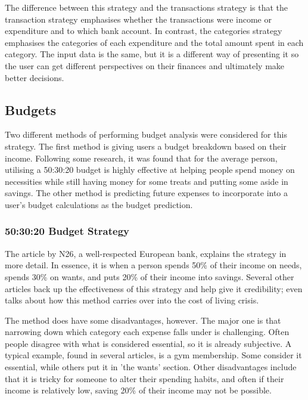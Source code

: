 The difference between this strategy and the transactions strategy is that the transaction strategy emphasises whether the transactions were income or expenditure and to which bank account. In contrast, the categories strategy emphasises the categories of each expenditure and the total amount spent in each category. The input data is the same, but it is a different way of presenting it so the user can get different perspectives on their finances and ultimately make better decisions.

\subsection{Budgets}
Two different methods of performing budget analysis were considered for this strategy. The first method is giving users a budget breakdown based on their income. Following some research, it was found that for the average person, utilising a 50:30:20 budget is highly effective at helping people spend money on necessities while still having money for some treats and putting some aside in savings. The other method is predicting future expenses to incorporate into a user's budget calculations as the budget prediction.

\subsubsection{50:30:20 Budget Strategy}

The article \cite{503020Strategy} by N26, a well-respected European bank, explains the strategy in more detail. In essence, it is when a person spends 50\% of their income on needs, spends 30\% on wants, and puts 20\% of their income into savings. Several other articles back up the effectiveness of this strategy and help give it credibility; \cite{503020InCostLivingCrisis} even talks about how this method carries over into the cost of living crisis.

The method does have some disadvantages, however. The major one is that narrowing down which category each expense falls under is challenging. Often people disagree with what is considered essential, so it is already subjective. A typical example, found in several articles, is a gym membership. Some consider it essential, while others put it in 'the wants' section. Other disadvantages include that it is tricky for someone to alter their spending habits, and often if their income is relatively low, saving 20\% of their income may not be possible.

